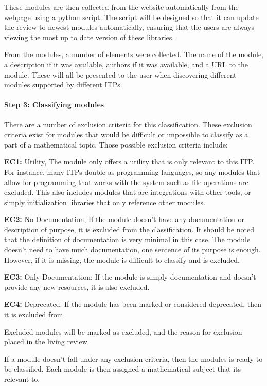 \documentclass[
]{article}
\begin{document}
These modules are then collected from the website automatically from the
webpage using a python script. The script will be designed so that it
can update the review to newest modules automatically, ensuring that the
users are always viewing the most up to date version of these libraries.

From the modules, a number of elements were collected. The name of the
module, a description if it was available, authors if it was available,
and a URL to the module. These will all be presented to the user when
discovering different modules supported by different ITPs.

\hypertarget{sec:classifying_modules_meth}{%
\paragraph{Step 3: Classifying
modules}\label{sec:classifying_modules_meth}}

There are a number of exclusion criteria for this classification. These
exclusion criteria exist for modules that would be difficult or
impossible to classify as a part of a mathematical topic. Those possible
exclusion criteria include:

\textbf{EC1:} Utility, The module only offers a utility that is only
relevant to this ITP. For instance, many ITPs double as programming
languages, so any modules that allow for programming that works with the
system such as file operations are excluded. This also includes modules
that are integrations with other tools, or simply initialization
libraries that only reference other modules.

\textbf{EC2:} No Documentation, If the module doesn't have any
documentation or description of purpose, it is excluded from the
classification. It should be noted that the definition of documentation
is very minimal in this case. The module doesn't need to have much
documentation, one sentence of its purpose is enough. However, if it is
missing, the module is difficult to classify and is excluded.

\textbf{EC3:} Only Documentation: If the module is simply documentation
and doesn't provide any new resources, it is also excluded.

\textbf{EC4:} Deprecated: If the module has been marked or considered
deprecated, then it is excluded from

Excluded modules will be marked as excluded, and the reason for
exclusion placed in the living review.

If a module doesn't fall under any exclusion criteria, then the modules
is ready to be classified. Each module is then assigned a mathematical
subject that its relevant to.
\end{document}

